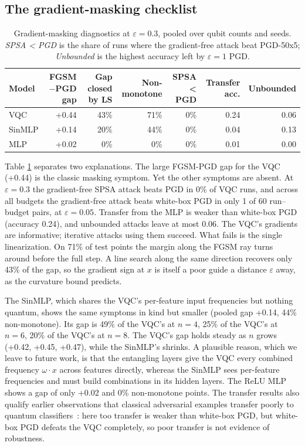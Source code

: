 \documentclass[11pt]{article}
\begin{document}
\subsection{The gradient-masking checklist}
\begin{table}[t]
\centering
\caption{Gradient-masking diagnostics at $\varepsilon=0.3$, pooled over qubit counts and seeds. \emph{SPSA < PGD} is the share of runs where the gradient-free attack beat PGD-50x5; \emph{Unbounded} is the highest accuracy left by $\varepsilon=1$ PGD.}
\label{tab:checklist}
\small
\begin{tabular}{lrrrrrr}
\toprule
\textbf{Model} & \textbf{FGSM$-$PGD gap} & \textbf{Gap closed by LS} & \textbf{Non-monotone} & \textbf{SPSA < PGD} & \textbf{Transfer acc.} & \textbf{Unbounded} \\
\midrule
VQC & +0.44 & 43\% & 71\% & 0\% & 0.24 & 0.06 \\
SinMLP & +0.14 & 20\% & 44\% & 0\% & 0.04 & 0.13 \\
MLP & +0.02 & 0\% & 0\% & 0\% & 0.01 & 0.00 \\
\bottomrule
\end{tabular}
\end{table}

Table \ref{tab:checklist} separates two explanations. The large FGSM-PGD gap for the VQC (+0.44) is the classic masking symptom. Yet the other symptoms are absent. At $\varepsilon=0.3$ the gradient-free SPSA attack beats PGD in 0\% of VQC runs, and across all budgets the gradient-free attack beats white-box PGD in only 1 of 60 run--budget pairs, at $\varepsilon=0.05$. Transfer from the MLP is weaker than white-box PGD (accuracy 0.24), and unbounded attacks leave at most 0.06. The VQC's gradients are informative; iterative attacks using them succeed. What fails is the single linearization. On 71\% of test points the margin along the FGSM ray turns around before the full step. A line search along the same direction recovers only 43\% of the gap, so the gradient sign at $x$ is itself a poor guide a distance $\varepsilon$ away, as the curvature bound predicts.

The SinMLP, which shares the VQC's per-feature input frequencies but nothing quantum, shows the same symptoms in kind but smaller (pooled gap +0.14, 44\% non-monotone). Its gap is 49\% of the VQC's at $n=4$, 25\% of the VQC's at $n=6$, 20\% of the VQC's at $n=8$. The VQC's gap holds steady as $n$ grows (+0.42, +0.45, +0.47), while the SinMLP's shrinks. A plausible reason, which we leave to future work, is that the entangling layers give the VQC every combined frequency $\omega\cdot x$ across features directly, whereas the SinMLP sees per-feature frequencies and must build combinations in its hidden layers. The ReLU MLP shows a gap of only +0.02 and 0\% non-monotone points. The transfer results also qualify earlier observations that classical adversarial examples transfer poorly to quantum classifiers~\cite{west2022}: here too transfer is weaker than white-box PGD, but white-box PGD defeats the VQC completely, so poor transfer is not evidence of robustness.
\end{document}
